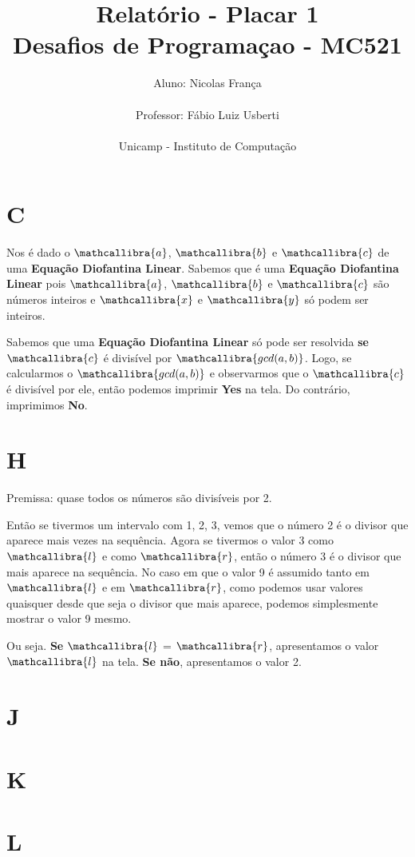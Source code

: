 \documentclass[a4paper,11pt,fleqn]{article}
\title{Relatório - Placar 1\\
Desafios de Programaçao - MC521}
\author{Aluno: Nicolas França\\\\
Professor: Fábio Luiz Usberti\\\\
Unicamp - Instituto de Computação\\}
\date{}
\begin{document}
\maketitle

\section{C}
\label{s:c}

Nos é dado o $\mathcallibra{a}$, $\mathcallibra{b}$ e $\mathcallibra{c}$ de uma 
  \textbf{Equação Diofantina Linear}. Sabemos que é uma \textbf{Equação Diofantina Linear} pois $\mathcallibra{a}$, $\mathcallibra{b}$ e 
  $\mathcallibra{c}$ são números inteiros e $\mathcallibra{x}$ e $\mathcallibra{y}$ só
  podem ser inteiros.

Sabemos que uma \textbf{Equação Diofantina Linear} só pode ser resolvida \textbf{se}
  $\mathcallibra{c}$ é divisível por $\mathcallibra{gcd(a, b)}$. Logo, se calcularmos
  o $\mathcallibra{gcd(a, b)}$ e observarmos que o $\mathcallibra{c}$ é divisível por ele,
  então podemos imprimir \textbf{Yes} na tela. Do contrário, imprimimos \textbf{No}.


\section{H}
\label{s:h}

Premissa: quase todos os números são divisíveis por 2.

Então se tivermos um intervalo com 1, 2, 3, vemos que o número 2 é o divisor que aparece mais
  vezes na sequência. Agora se tivermos o valor 3 como $\mathcallibra{l}$ e como $\mathcallibra{r}$,
  então o número 3 é o divisor que mais aparece na sequência.
  No caso em que o valor 9 é assumido tanto em $\mathcallibra{l}$ e em $\mathcallibra{r}$, como podemos
  usar valores quaisquer desde que seja o divisor que mais aparece, podemos simplesmente mostrar o 
  valor 9 mesmo.

Ou seja. \textbf{Se} $\mathcallibra{l}$ = $\mathcallibra{r}$, apresentamos o valor $\mathcallibra{l}$ na tela. \textbf{Se não}, apresentamos
  o valor 2.


\section{J}
\label{s:j}


\section{K}
\label{s:k}


\section{L}
\label{s:l}




\end{document}
